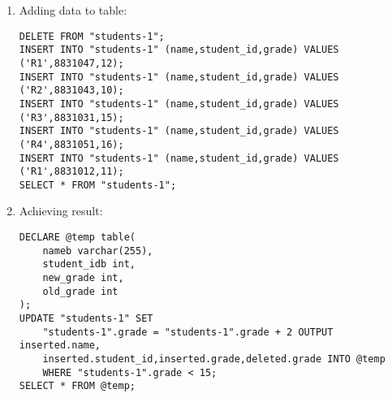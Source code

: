 \documentclass{article}
\begin{document}
\begin{enumerate}
		\begin{enumerate}
			\item Adding data to table:
				\begin{verbatim}
DELETE FROM "students-1";
INSERT INTO "students-1" (name,student_id,grade) VALUES ('R1',8831047,12);
INSERT INTO "students-1" (name,student_id,grade) VALUES ('R2',8831043,10);
INSERT INTO "students-1" (name,student_id,grade) VALUES ('R3',8831031,15);
INSERT INTO "students-1" (name,student_id,grade) VALUES ('R4',8831051,16);
INSERT INTO "students-1" (name,student_id,grade) VALUES ('R1',8831012,11);
SELECT * FROM "students-1";
				\end{verbatim}
			\item Achieving result:
				\begin{verbatim}
DECLARE @temp table(
	nameb varchar(255),
	student_idb int,
	new_grade int,
	old_grade int
);
UPDATE "students-1" SET 
	"students-1".grade = "students-1".grade + 2 OUTPUT inserted.name,
	inserted.student_id,inserted.grade,deleted.grade INTO @temp
	WHERE "students-1".grade < 15;
SELECT * FROM @temp;
				\end{verbatim}
		\end{enumerate}
\end{enumerate}
\end{document}

